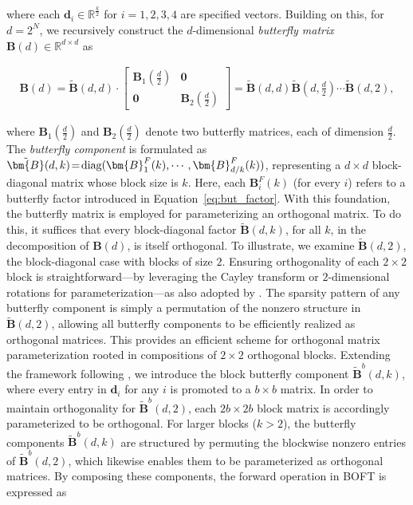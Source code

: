 where each $\bm{d}_i\in\mathbb{R}^{\frac{k}{2}}$ for $i=1,2,3,4$ are specified vectors. Building on this, for $d=2^N$, we recursively construct the $d$-dimensional \emph{butterfly matrix} $\bm{B}(d)\in\mathbb{R}^{d\times d}$ as

\begin{equation}
\begin{aligned}
    \!\!\bm{B}(d)=\tilde{\bm{B}}(d,d)\!\cdot\!\begin{bmatrix}
    \bm{B}_1(\frac{d}{2})\!\!\!\!\! & \bm{0} \\
    \bm{0}\!\!\!\!\! &\bm{B}_2(\frac{d}{2})
    \end{bmatrix}= \tilde{\bm{B}}(d,d)\tilde{\bm{B}}(d,\frac{d}{2})\cdots\tilde{\bm{B}}(d,2),
\end{aligned}
\end{equation}

where $\bm{B}_1(\frac{d}{2})$ and $\bm{B}_2(\frac{d}{2})$ denote two butterfly matrices, each of dimension $\frac{d}{2}$. The \emph{butterfly component} is formulated as $\thickmuskip=2mu \medmuskip=2mu \tilde{\bm{B}}(d,k)=\text{diag}(\bm{B}^F_1(k),\cdots,\bm{B}^F_{d/k}(k))$, representing a $d \times d$ block-diagonal matrix whose block size is $k$. Here, each $\bm{B}^F_i(k)$ (for every $i$) refers to a butterfly factor introduced in Equation~\ref{eq:but_factor}. With this foundation, the butterfly matrix is employed for parameterizing an orthogonal matrix. To do this, it suffices that every block-diagonal factor $\tilde{\bm{B}}(d,k)$, for all $k$, in the decomposition of $\bm{B}(d)$, is itself orthogonal. To illustrate, we examine $\tilde{\bm{B}}(d,2)$, the block-diagonal case with blocks of size $2$. Ensuring orthogonality of each $2 \times 2$ block is straightforward—by leveraging the Cayley transform or $2$-dimensional rotations for parameterization—as also adopted by \cite{liu2021orthogonal,qiu2023controlling}. The sparsity pattern of any butterfly component is simply a permutation of the nonzero structure in $\tilde{\bm{B}}(d,2)$, allowing all butterfly components to be efficiently realized as orthogonal matrices. This provides an efficient scheme for orthogonal matrix parameterization rooted in compositions of $2 \times 2$ orthogonal blocks. Extending the framework following \cite{chen2022pixelated}, we introduce the block butterfly component $\tilde{\bm{B}}^b(d,k)$, where every entry in $\bm{d}_i$ for any $i$ is promoted to a $b\times b$ matrix. In order to maintain orthogonality for $\tilde{\bm{B}}^b(d,2)$, each $2b \times 2b$ block matrix is accordingly parameterized to be orthogonal. For larger blocks ($k>2$), the butterfly components $\tilde{\bm{B}}^b(d,k)$ are structured by permuting the blockwise nonzero entries of $\tilde{\bm{B}}^b(d,2)$, which likewise enables them to be parameterized as orthogonal matrices. By composing these components, the forward operation in BOFT is expressed as

